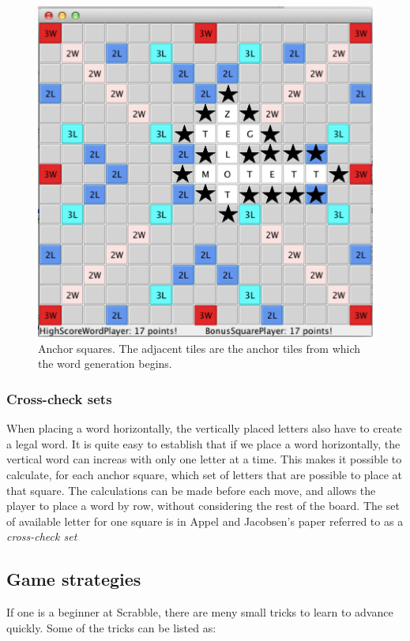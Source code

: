 \documentclass[a4paper, 12pt]{report}
\begin{document}
\begin{figure}
\centering
\includegraphics[scale=0.5]{anchors}
\caption{Anchor squares. The adjacent tiles are the anchor tiles from which the word generation begins.}
\label{fig:anchors}
\end{figure}

\subsubsection{Cross-check sets}
When placing a word horizontally, the vertically placed letters also have to create a legal word. It is quite easy to establish that if we place a word horizontally, the vertical word can increas with only one letter at a time. This makes it possible to calculate, for each anchor square, which set of letters that are possible to place at that square. The calculations can be made before each move, and allows the player to place a word by row, without considering the rest of the board. The set of available letter for one square is in Appel and Jacobsen's paper \cite{fastest} referred to as a \emph{cross-check set}

\subsection{Game strategies}
\label{sec:strategies}
If one is a beginner at Scrabble, there are meny small tricks to learn to advance quickly. Some of the tricks can be listed as:
\end{document}
